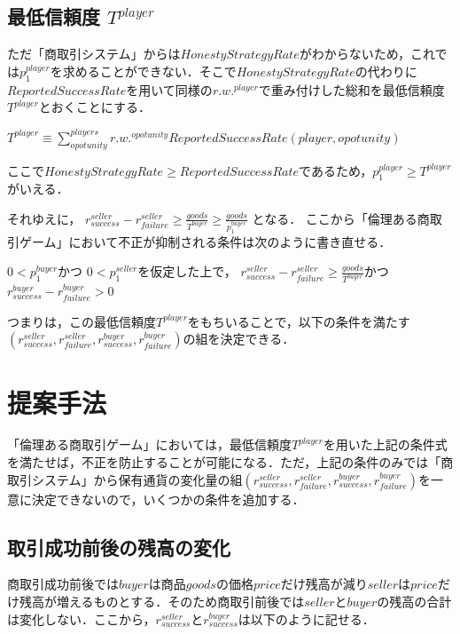 \documentclass[twocolumn, a4j]{article}
\begin{document}
\subsection{最低信頼度 $ T^{player} $}

ただ「商取引システム」からは$ HonestyStrategyRate $がわからないため，これでは$ p^{player}_1 $を求めることができない．そこで$ HonestyStrategyRate $の代わりに$ ReportedSuccessRate $を用いて同様の$ r.w.^{player} $で重み付けした総和を最低信頼度$ T^{player} $とおくことにする．

$ T^{player} \equiv \sum^{players}_{opotunity} {r.w.}^{opotunity} ReportedSuccessRate(player, opotunity) $

ここで$ HonestyStrategyRate \geq ReportedSuccessRate $であるため，$ p^{player}_1 \geq T^{player} $がいえる．

それゆえに，
$ r^{seller}_{success} - r^{seller}_{failure}  \geq \frac{goods}{T^{buyer}} \geq \frac{goods}{p^{buyer}_1} $
となる．
ここから「倫理ある商取引ゲーム」において不正が抑制される条件は次のように書き直せる．

$ 0<p^{buyer}_1 $かつ $ 0 < p^{seller}_{1} $を仮定した上で，
$ r^{seller}_{success} - r^{seller}_{failure} \geq \frac{goods}{T^{buyer}} $かつ$ r^{buyer}_{success} - r^{buyer}_{failure} > 0 $

つまりは，この最低信頼度$ T^{player} $をもちいることで，以下の条件を満たす$ (r^{seller}_{success}, r^{seller}_{failure}, r^{buyer}_{success}, r^{buyer}_{failure}) $の組を決定できる．


\section{提案手法}
「倫理ある商取引ゲーム」においては，最低信頼度$ T^{player} $を用いた上記の条件式を満たせば，不正を防止することが可能になる．ただ，上記の条件のみでは「商取引システム」から保有通貨の変化量の組$ (r^{seller}_{success}, r^{seller}_{failure}, r^{buyer}_{success}, r^{buyer}_{failure}) $を一意に決定できないので，いくつかの条件を追加する．


\subsection{取引成功前後の残高の変化}
商取引成功前後では$ buyer $は商品$ goods $の価格$ price $だけ残高が減り$ seller $は$ price $だけ残高が増えるものとする．そのため商取引前後では$ seller $と$ buyer $の残高の合計は変化しない．ここから，$ r^{seller}_{success} $と$ r^{buyer}_{success} $は以下のように記せる．
\end{document}
